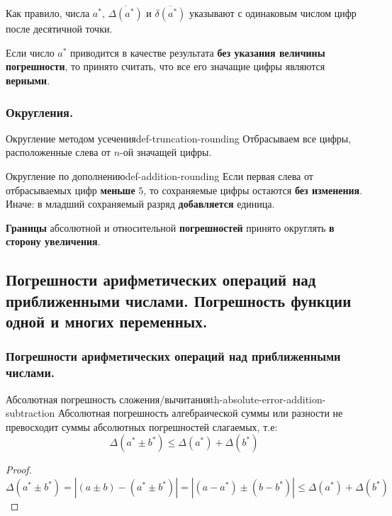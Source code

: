 \documentclass[14pt]{extarticle}
\begin{document}
    Как правило, числа $a^{*}$, $\overline{\Delta(a^{*})}$ и $\overline{\delta(a^{*})}$ указывают с одинаковым числом цифр после десятичной точки.

    \vspace{\baselineskip}
    
    Если число $a^{*}$ приводится в качестве результата \textbf{без указания величины погрешности}, то принято считать, что все его значащие цифры являются \textbf{верными}.

    \subsubsection{Округления.}

        \begin{definition}{Округление методом усечения}{def-truncation-rounding}
            Отбрасываем все цифры, расположенные слева от $n$-ой значащей цифры.
        \end{definition}

        \begin{definition}{Округление по дополнению}{def-addition-rounding}
            Если первая слева от отбрасываемых цифр \textbf{меньше} $5$, то сохраняемые цифры остаются \textbf{без изменения}.\\ 
            Иначе: в младший сохраняемый разряд \textbf{добавляется} единица.  
        \end{definition}

        \textbf{Границы} абсолютной и относительной \textbf{погрешностей} принято округлять \textbf{в сторону увеличения}.

\clearpage
\subsection{Погрешности арифметических операций над приближенными числами. Погрешность функции одной и многих переменных.}

    \subsubsection{Погрешности арифметических операций над приближенными числами.}
        
        \begin{theorem}{Абсолютная погрешность сложения/вычитания}{th-absolute-error-addition-subtraction}
            Абсолютная погрешность алгебраической суммы или разности не превосходит суммы абсолютных погрешностей слагаемых, т.е:
            $$\Delta(a^{*} \pm b^{*}) \leq \Delta(a^{*}) + \Delta(b^{*})$$
        
            \begin{proof}
                $$\Delta(a^{*} \pm b^{*}) = |(a \pm b) - (a^{*} \pm b^{*})| = |(a - a^{*}) \pm (b - b^{*})| \leq \Delta(a^{*}) + \Delta(b^{*})$$
            \end{proof}
        \end{theorem}
\end{document}
